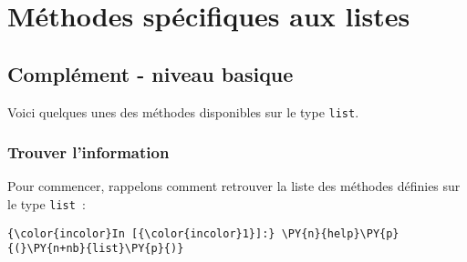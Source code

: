     \hypertarget{muxe9thodes-spuxe9cifiques-aux-listes}{%
\section{Méthodes spécifiques aux
listes}\label{muxe9thodes-spuxe9cifiques-aux-listes}}

    \hypertarget{compluxe9ment---niveau-basique}{%
\subsection{Complément - niveau
basique}\label{compluxe9ment---niveau-basique}}

    Voici quelques unes des méthodes disponibles sur le type \texttt{list}.

    \hypertarget{trouver-linformation}{%
\subsubsection{Trouver l'information}\label{trouver-linformation}}

    Pour commencer, rappelons comment retrouver la liste des méthodes
définies sur le type \texttt{list}~:

    \begin{Verbatim}[commandchars=\\\{\}]
{\color{incolor}In [{\color{incolor}1}]:} \PY{n}{help}\PY{p}{(}\PY{n+nb}{list}\PY{p}{)}
\end{Verbatim}


